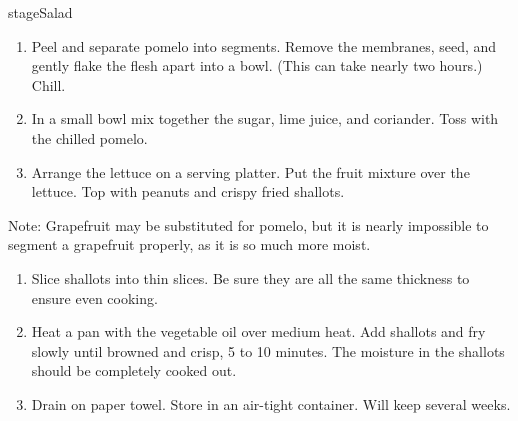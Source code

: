 

stage{Salad}

\begin{ingredients}
\end{ingredients}


\begin{recipe}
  \begin{enumerate}

  \item Peel and separate pomelo into segments.  Remove the membranes,
    seed, and gently flake the flesh apart into a bowl.  (This can
    take nearly two hours.)  Chill.

  \item In a small bowl mix together the sugar, lime juice, and
    coriander.  Toss with the chilled pomelo.

  \item Arrange the lettuce on a serving platter.  Put the fruit
    mixture over the lettuce.  Top with peanuts and crispy fried
    shallots.

  \end{enumerate}
\end{recipe}

Note: Grapefruit may be substituted for pomelo, but it is nearly
impossible to segment a grapefruit properly, as it is so much more
moist.



\begin{ingredients}
\end{ingredients}


\begin{recipe}
  \begin{enumerate}

  \item Slice shallots into thin slices.  Be sure they are all the
    same thickness to ensure even cooking.

  \item Heat a pan with the vegetable oil over medium heat. Add
    shallots and fry slowly until browned and crisp, 5 to 10 minutes.
    The moisture in the shallots should be completely cooked out.

  \item Drain on paper towel. Store in an air-tight container.  Will
    keep several weeks.

  \end{enumerate}
\end{recipe}

